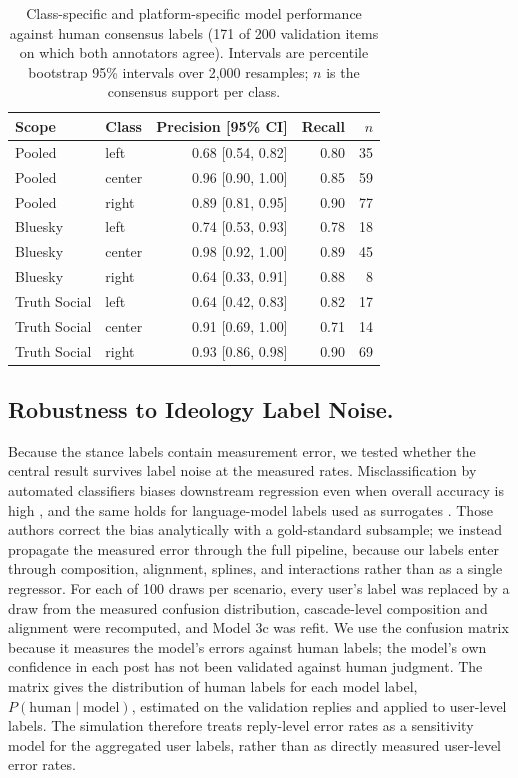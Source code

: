 \documentclass[letterpaper]{article} %
\newcommand{\rev}[1]{{\color{blue}#1}}
\begin{document}
\begin{table}[!t]
\centering
\small
\rev{
\begin{tabular}{llrrr}
\toprule
Scope & Class & Precision [95\% CI] & Recall & $n$ \\
\midrule
Pooled & left & 0.68 [0.54, 0.82] & 0.80 & 35 \\
Pooled & center & 0.96 [0.90, 1.00] & 0.85 & 59 \\
Pooled & right & 0.89 [0.81, 0.95] & 0.90 & 77 \\
\midrule
Bluesky & left & 0.74 [0.53, 0.93] & 0.78 & 18 \\
Bluesky & center & 0.98 [0.92, 1.00] & 0.89 & 45 \\
Bluesky & right & 0.64 [0.33, 0.91] & 0.88 & 8 \\
\midrule
Truth Social & left & 0.64 [0.42, 0.83] & 0.82 & 17 \\
Truth Social & center & 0.91 [0.69, 1.00] & 0.71 & 14 \\
Truth Social & right & 0.93 [0.86, 0.98] & 0.90 & 69 \\
\bottomrule
\end{tabular}
}
\caption{\rev{Class-specific and platform-specific model performance against human consensus labels (171 of 200 validation items on which both annotators agree). Intervals are percentile bootstrap 95\% intervals over 2{,}000 resamples; $n$ is the consensus support per class.}}
\label{tab:validation}
\end{table}

\subsection*{\rev{Robustness to Ideology Label Noise.}}

\rev{Because the stance labels contain measurement error, we tested whether the central result survives label noise at the measured rates. Misclassification by automated classifiers biases downstream regression even when overall accuracy is high \citep{teblunthuis_misclassification_2024}, and the same holds for language-model labels used as surrogates \citep{egami_imperfect_2023}. Those authors correct the bias analytically with a gold-standard subsample; we instead propagate the measured error through the full pipeline, because our labels enter through composition, alignment, splines, and interactions rather than as a single regressor. For each of 100 draws per scenario, every user's label was replaced by a draw from the measured confusion distribution, cascade-level composition and alignment were recomputed, and Model 3c was refit. We use the confusion matrix because it measures the model's errors against human labels; the model's own confidence in each post has not been validated against human judgment. The matrix gives the distribution of human labels for each model label, $P(\text{human} \mid \text{model})$, estimated on the validation replies and applied to user-level labels. The simulation therefore treats reply-level error rates as a sensitivity model for the aggregated user labels, rather than as directly measured user-level error rates.}
\end{document}
